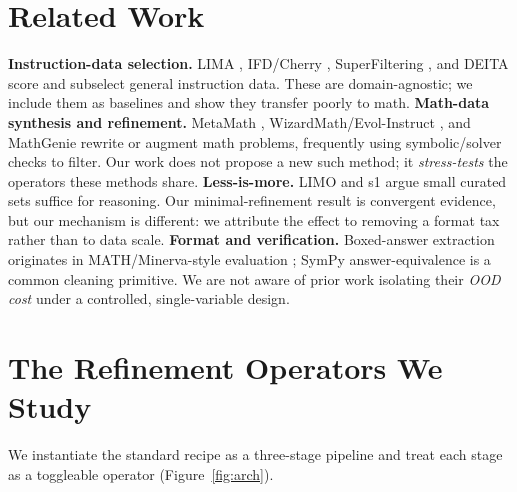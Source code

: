 \documentclass[letterpaper]{article} %
\begin{document}
\section{Related Work}
\textbf{Instruction-data selection.} LIMA \citep{zhou2023lima}, IFD/Cherry \citep{li2023quantity}, SuperFiltering \citep{li2024superfiltering}, and DEITA \citep{liu2023deita} score and subselect general instruction data. These are domain-agnostic; we include them as baselines and show they transfer poorly to math.
\textbf{Math-data synthesis and refinement.} MetaMath \citep{yu2023metamath}, WizardMath/Evol-Instruct \citep{xu2023wizardlm}, and MathGenie \citep{lu2024mathgenie} rewrite or augment math problems, frequently using symbolic/solver checks to filter. Our work does not propose a new such method; it \emph{stress-tests} the operators these methods share.
\textbf{Less-is-more.} LIMO \citep{ye2025limo} and s1 \citep{muennighoff2025s1} argue small curated sets suffice for reasoning. Our minimal-refinement result is convergent evidence, but our mechanism is different: we attribute the effect to removing a format tax rather than to data scale.
\textbf{Format and verification.} Boxed-answer extraction originates in MATH/Minerva-style evaluation \citep{hendrycks2021math}; SymPy answer-equivalence is a common cleaning primitive. We are not aware of prior work isolating their \emph{OOD cost} under a controlled, single-variable design.

\section{The Refinement Operators We Study}
We instantiate the standard recipe as a three-stage pipeline and treat each stage as a toggleable operator (Figure~\ref{fig:arch}).
\end{document}
